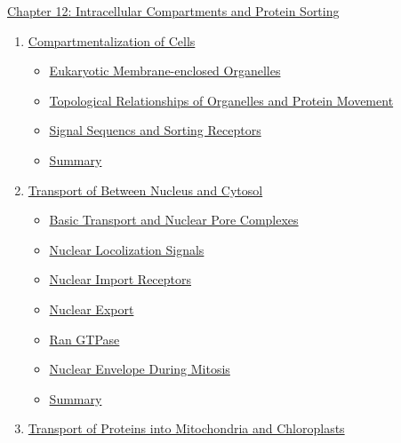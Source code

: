 \documentclass[12pt,letterpaper]{article}
\newcommand{\thetitle}{\hypertarget{home}{Cellular Biology}}
\begin{document}

\clearpage
\renewcommand{\thetitle}{\hypertarget{12}{Intracellular Compartments and Protein Sorting}}
\hypertarget{12}{}

\begin{chapbox}{\hyperlink{home}{Chapter 12: Intracellular Compartments and Protein Sorting}}
    \begin{enumerate}
        \item \hyperlink{12.1}{Compartmentalization of Cells}
            \begin{itemize}
                \item \hyperlink{12.1.1}{Eukaryotic Membrane-enclosed Organelles}
                \item \hyperlink{12.1.2}{Topological Relationships of Organelles and Protein Movement}
                \item \hyperlink{12.1.3}{Signal Sequencs and Sorting Receptors}
                \item \hyperlink{12.1.r}{Summary}
            \end{itemize}
        \item \hyperlink{12.2}{Transport of Between Nucleus and Cytosol}
            \begin{itemize}
                \item \hyperlink{12.2.1}{Basic Transport and Nuclear Pore Complexes}
                \item \hyperlink{12.2.2}{Nuclear Locolization Signals}
                \item \hyperlink{12.2.3}{Nuclear Import Receptors}
                \item \hyperlink{12.2.4}{Nuclear Export}
                \item \hyperlink{12.2.5}{Ran GTPase}
                \item \hyperlink{12.2.6}{Nuclear Envelope During Mitosis}
                \item \hyperlink{12.2.r}{Summary}
            \end{itemize}
        \item \hyperlink{12.3}{Transport of Proteins into Mitochondria and Chloroplasts}

\end{enumerate}
\end{chapbox}
\end{document}
